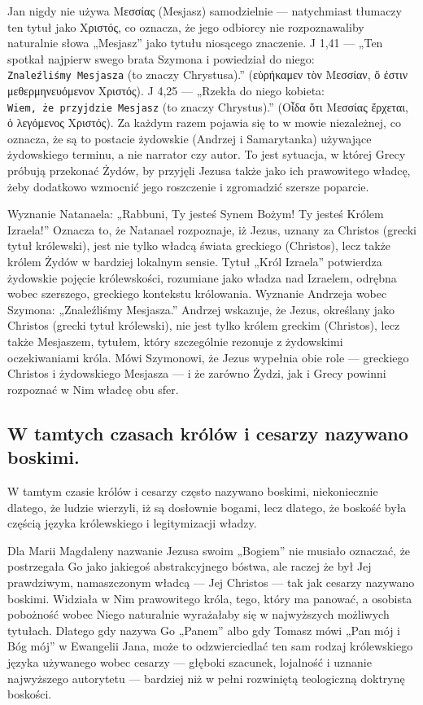Jan nigdy nie używa Μεσσίας (Mesjasz) samodzielnie --- natychmiast tłumaczy ten tytuł jako Χριστός, co oznacza, że jego odbiorcy nie rozpoznawaliby naturalnie słowa „Mesjasz” jako tytułu niosącego znaczenie.
J 1,41 --- „Ten spotkał najpierw swego brata Szymona i powiedział do niego: \texttt{Znaleźliśmy\ Mesjasza} (to znaczy Chrystusa).” (εὑρήκαμεν τὸν Μεσσίαν, ὅ ἐστιν μεθερμηνευόμενον Χριστός).
J 4,25 --- „Rzekła do niego kobieta: \texttt{Wiem,\ że\ przyjdzie\ Mesjasz} (to znaczy Chrystus).” (Οἶδα ὅτι Μεσσίας ἔρχεται, ὁ λεγόμενος Χριστός).
Za każdym razem pojawia się to w mowie niezależnej, co oznacza, że są to postacie żydowskie (Andrzej i Samarytanka) używające żydowskiego terminu, a nie narrator czy autor.
To jest sytuacja, w której Grecy próbują przekonać Żydów, by przyjęli Jezusa także jako ich prawowitego władcę, żeby dodatkowo wzmocnić jego roszczenie i zgromadzić szersze poparcie.

Wyznanie Natanaela: „Rabbuni, Ty jesteś Synem Bożym!
Ty jesteś Królem Izraela!”
Oznacza to, że Natanael rozpoznaje, iż Jezus, uznany za Christos (grecki tytuł królewski), jest nie tylko władcą świata greckiego (Christos), lecz także królem Żydów w bardziej lokalnym sensie.
Tytuł „Król Izraela” potwierdza żydowskie pojęcie królewskości, rozumiane jako władza nad Izraelem, odrębna wobec szerszego, greckiego kontekstu królowania.
Wyznanie Andrzeja wobec Szymona: „Znaleźliśmy Mesjasza.”
Andrzej wskazuje, że Jezus, określany jako Christos (grecki tytuł królewski), nie jest tylko królem greckim (Christos), lecz także Mesjaszem, tytułem, który szczególnie rezonuje z żydowskimi oczekiwaniami króla.
Mówi Szymonowi, że Jezus wypełnia obie role --- greckiego Christos i żydowskiego Mesjasza --- i że zarówno Żydzi, jak i Grecy powinni rozpoznać w Nim władcę obu sfer.

\subsection{W tamtych czasach królów i cesarzy nazywano boskimi.}\label{subsec:in-that-time-kings-and-emperors-were-often-called-divine-not-necessarily-because-people-believed-they-were-literal-gods-but-because-divinity-was-part-of-royal-language-and-legitimacy.}

W tamtym czasie królów i cesarzy często nazywano boskimi, niekoniecznie dlatego, że ludzie wierzyli, iż są dosłownie bogami, lecz dlatego, że boskość była częścią języka królewskiego i legitymizacji władzy.

Dla Marii Magdaleny nazwanie Jezusa swoim „Bogiem” nie musiało oznaczać, że postrzegała Go jako jakiegoś abstrakcyjnego bóstwa, ale raczej że był Jej prawdziwym, namaszczonym władcą --- Jej Christos --- tak jak cesarzy nazywano boskimi.
Widziała w Nim prawowitego króla, tego, który ma panować, a osobista pobożność wobec Niego naturalnie wyrażałaby się w najwyższych możliwych tytułach.
Dlatego gdy nazywa Go „Panem” albo gdy Tomasz mówi „Pan mój i Bóg mój” w Ewangelii Jana, może to odzwierciedlać ten sam rodzaj królewskiego języka używanego wobec cesarzy --- głęboki szacunek, lojalność i uznanie najwyższego autorytetu --- bardziej niż w pełni rozwiniętą teologiczną doktrynę boskości.

